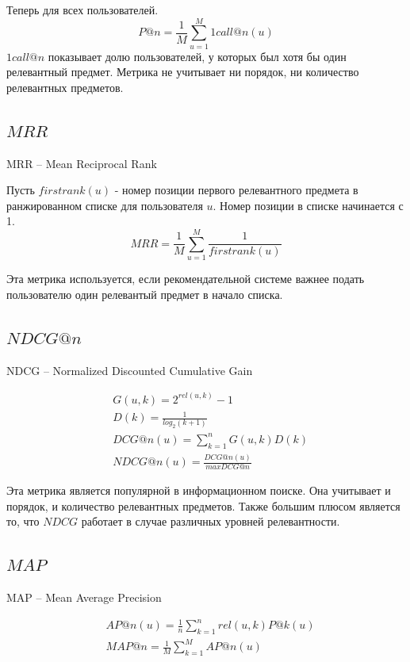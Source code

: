 \documentclass[14pt]{extarticle}
\begin{document}
	Теперь для всех пользователей.
	\begin{equation*}
		P@n = \frac{1}{M}\sum_{u = 1}^M 1call@n(u)
	\end{equation*}
	$1call@n$ показывает долю пользователей, у которых был хотя бы один релевантный предмет. Метрика не учитывает  ни порядок, ни количество релевантных предметов. 
\subsection{$MRR$}
	MRR -- Mean Reciprocal Rank
	
	Пусть $firstrank(u)$  - номер позиции первого релевантного предмета в ранжированном списке для пользователя $u$. Номер позиции в списке начинается с 1.
	\begin{equation*}
		MRR = \frac{1}{M}\sum^{M}_{u=1}\frac{1}{firstrank(u)}	
	\end{equation*}
	
	Эта метрика используется, если рекомендательной системе важнее подать пользователю один релевантый предмет в начало списка. 

	 
\subsection{$NDCG@n$}
	NDCG -- Normalized Discounted Cumulative Gain
	
	\begin{equation*}
	\begin{split}
	 & G(u, k) = 2^{rel(u, k)} - 1 \\
	 & D(k) = \frac{1}{log_2(k + 1)} \\
	 & DCG@n(u) = \sum_{k=1}^n G(u, k) D(k) \\
	 & NDCG@n(u) = \frac{DCG@n(u)}{max DCG@n}
	\end{split}			
	\end{equation*}
	
	Эта метрика является популярной в информационном поиске. Она учитывает и порядок, и количество релевантных предметов. Также большим плюсом является то, что $NDCG$ работает в случае различных уровней релевантности.
	
\subsection{$MAP$}
	MAP -- 	Mean Average Precision
	
	
	\begin{equation*}
	\begin{split}
	 & AP@n(u) = \frac{1}{n}\sum_{k=1}^n rel(u, k) P@k(u)  \\
	 & MAP@n = \frac{1}{M}\sum_{k=1}^M AP@n(u) \\
	\end{split}			
	\end{equation*}
	
\end{document}
